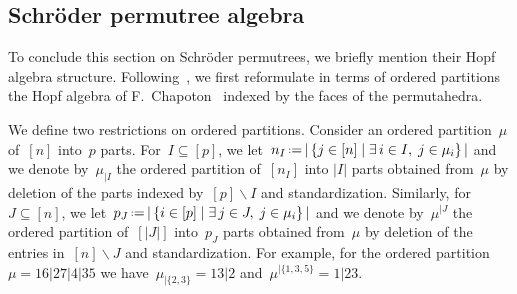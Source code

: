 \documentclass[ALCO]{cedram}
\newcommand{\set}[2]{\left\{ #1 \;\middle|\; #2 \right\}} %
\newcommand{\ssm}{\smallsetminus} %
\newcommand{\eqdef}{\mbox{\,\raisebox{0.2ex}{\scriptsize\ensuremath{\mathrm:}}\ensuremath{=}\,}} %
\newcommand{\sep}{|} %
\begin{document}

\subsection{Schr\"oder permutree algebra}
\label{subsec:permutreeAlgebraSchroder}

To conclude this section on Schr\"oder permutrees, we briefly mention their Hopf algebra structure. Following~\cite{ChatelPilaud}, we first reformulate in terms of ordered partitions the Hopf algebra of F.~Chapoton~\cite{Chapoton} indexed by the faces of the permutahedra.

We define two restrictions on ordered partitions. Consider an ordered partition~$\mu$ of~$[n]$ into~$p$ parts. For~${I \subseteq [p]}$, we let~$n_I \eqdef |\set{j \in [n]}{\exists \, i \in I, \; j \in \mu_i}|$ and we denote by~$\mu_{|I}$ the ordered partition of~$[n_I]$ into $|I|$ parts obtained from~$\mu$ by deletion of the parts indexed by~$[p] \ssm I$ and standardization. Similarly, for~$J \subseteq [n]$, we let~$p_J \eqdef |\set{i \in [p]}{\exists \, j \in J, \; j \in \mu_i}|$ and we denote by~$\mu^{|J}$ the ordered partition of~$[|J|]$ into~$p_J$ parts obtained from~$\mu$ by deletion of the entries in~$[n] \ssm J$ and standardization. For example, for the ordered partition~$\mu = 16 \sep 27 \sep 4 \sep 35$ we have~$\mu_{|\{2,3\}} = 13 \sep 2$ and~$\mu^{|\{1,3,5\}} = 1 \sep 23$.
\end{document}
